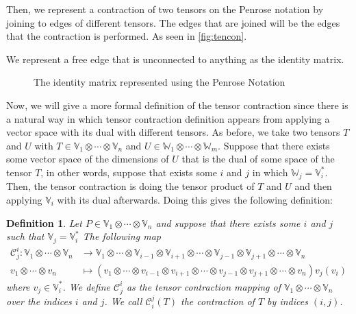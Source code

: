 \documentclass[11pt,a4paper,openright,oneside]{book}
\numberwithin{equation}{section}
\newtheorem{defn0}{Definition}[chapter]
\newenvironment{definition}{ \begin{defn0}}{\end{defn0}}
\newcommand{\figref}[1]{\cref{#1}}
\begin{document}
Then, we represent a contraction of two tensors on the Penrose notation by joining to edges of different tensors. The edges that are
joined will be the edges that the contraction is performed. As seen in \figref{fig:tencon}.

We represent a free edge that is unconnected to anything as the identity matrix.
\begin{figure}
    \centering

    \caption{
        The identity matrix represented using the Penrose Notation
    }
\end{figure}

Now, we will give a more formal definition of the tensor contraction since there is a natural way in which tensor contraction definition
appears from applying a vector space with its dual with different tensors. As before, we take two tensors $T$ and $U$ with
$T \in \mathbb{V}_1 \otimes \cdots \otimes \mathbb{V}_n$ and $U \in \mathbb{W}_1 \otimes \cdots \otimes \mathbb{W}_m$. Suppose that there exists
some vector space of the dimensions of $U$ that is the dual of some space of the tensor $T$, in other words, suppose that exists
some $i$ and $j$ in which $\mathbb{W}_j = \mathbb{V}_i^*$. Then, the tensor contraction is doing the tensor product of $T$ and $U$ and then applying
$\mathbb{V}_i$ with its dual afterwards. Doing this gives the following definition:

\begin{definition}
    Let $P \in \mathbb{V}_1 \otimes \cdots \otimes \mathbb{V}_n$
    and suppose that there exists some $i$ and $j$ such
    that $\mathbb{V}_j = \mathbb{V}_i^*$ The following map
    $$
    \begin{align}
    \mathcal{C}_j^i: 
    \mathbb{V}_1 \otimes \cdots \otimes \mathbb{V}_n &\longrightarrow 
    \mathbb{V}_1 \otimes \cdots \otimes \mathbb{V}_{i-1} \otimes \mathbb{V}_{i+1} \otimes \cdots \otimes \mathbb{V}_{j-1} \otimes \mathbb{V}_{j+1} \otimes \cdots \otimes \mathbb{V}_n \\
 v_1 \otimes \cdots \otimes v_n
                                                     &\longmapsto \left( v_1 \otimes \cdots \otimes v_{i-1} \otimes v_{i+1} \otimes \cdots \otimes v_{j-1} \otimes v_{j+1} \otimes \cdots \otimes v_n \right) v_j(v_i)
\end{align}
$$
where $v_j \in \mathbb{V}_i^*$. We define 
$\mathcal{C}_j^i$ as the tensor contraction mapping of $\mathbb{V}_1 \otimes \cdots \otimes \mathbb{V}_n$ over the indices $i$ and $j$.
We call $\mathcal{C}_i^j(T)$ the contraction of $T$ by indices $(i,j)$.
\label{def:contraction}
\end{definition}
\end{document}
